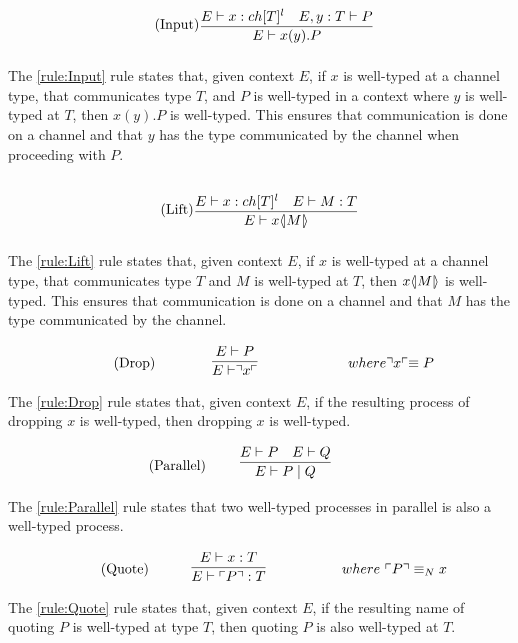 \begin{align*}
\tag{Input}\label{rule:Input} &\infrule{E\vdash x:ch[T]^l\quad E,y:T\vdash P}{E \vdash \inp{x}{y}P}
\end{align*}
The \ref{rule:Input} rule states that, given context $E$, if $x$ is well-typed at a channel type, that communicates type $T$, and $P$ is well-typed in a context where $y$ is well-typed at $T$, then $x(y).P$ is well-typed.
This ensures that communication is done on a channel and that $y$ has the type communicated by the channel when proceeding with $P$.

\begin{align*}
\tag{Lift}\label{rule:Lift} &\infrule{E\vdash x:ch[T]^l\quad E \vdash M:T}{E\vdash \lift{x}{M}}
\end{align*}
The \ref{rule:Lift} rule states that, given context $E$, if $x$ is well-typed at a channel type, that communicates type $T$ and $M$ is well-typed at $T$, then $x \langle \! | M | \! \rangle$ is well-typed.
This ensures that communication is done on a channel and that $M$ has the type communicated by the channel.

\begin{align*}
\tag{Drop}\label{rule:Drop} &\infrule{E \vdash P}{E\vdash \drop{x}}& where \drop{x} \equiv P
\end{align*}
The \ref{rule:Drop} rule states that, given context $E$, if the resulting process of dropping $x$ is well-typed, then dropping $x$ is well-typed.

\begin{align*}
\tag{Parallel}\label{rule:Parallel} &\infrule{E\vdash P \quad E \vdash Q}{E \vdash P \para Q}
\end{align*}
The \ref{rule:Parallel} rule states that two well-typed processes in parallel is also a well-typed process.

\begin{align*}
\tag{Quote}\label{rule:Quote} &\infrule{E \vdash x:T}{E\vdash \quot{P}:T}& where\ \quot{P} \equiv_N x
\end{align*}
The \ref{rule:Quote} rule states that, given context $E$, if the resulting name of quoting $P$ is well-typed at type $T$, then quoting $P$ is also well-typed at $T$.

